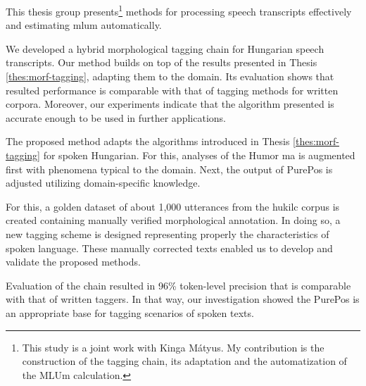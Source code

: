 This thesis group presents\footnote{This study is a joint work with Kinga Mátyus. 
My contribution is the construction of the tagging chain, its adaptation and the automatization of the MLUm calculation.} methods for processing speech transcripts effectively and estimating \acrlong{mlum} automatically.

\begin{core}
\begin{thesis}
\label{thes:spoken-morf-tagging}
We developed a hybrid morphological tagging chain for Hungarian speech transcripts.
Our method builds on top of the results presented in Thesis \ref{thes:morf-tagging}, adapting them to the domain.
Its evaluation shows that resulted performance is comparable with that of tagging methods for written corpora.
Moreover, our experiments indicate that the algorithm presented is accurate enough to be used in further applications.
\end{thesis}

\begin{pub}
\cite{Matyus2014,Orosz2014c}
\end{pub}
\end{core}

The proposed method adapts the algorithms introduced in Thesis \ref{thes:morf-tagging} for spoken Hungarian.
For this, analyses of the Humor \acrlong{ma} is augmented first with phenomena typical to the domain.
Next, the output of PurePos is adjusted utilizing domain-specific knowledge.

For this, a golden dataset of about 1,000 utterances from the \acrshort{hukilc} corpus is created containing manually verified morphological annotation. 
In doing so, a new tagging scheme is designed representing properly the characteristics of spoken language.
These manually corrected texts enabled us to develop and validate the proposed methods.

Evaluation of the chain resulted in 96\% token-level precision that is comparable with that of written taggers.
In that way, our investigation showed the PurePos is an appropriate base for tagging scenarios of spoken texts.

\thesisline%


